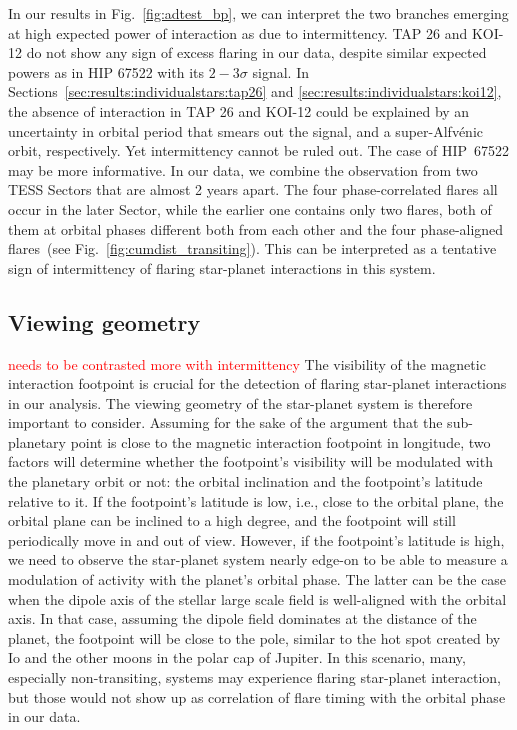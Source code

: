 \documentclass[twocolumn]{aastex631}
\begin{document}
In our results in Fig.~\ref{fig:adtest_bp}, we can interpret the two branches emerging at high expected power of interaction as due to intermittency. TAP 26 and KOI-12 do not show any sign of excess flaring in our data, despite similar expected powers as in HIP 67522 with its $2-3\sigma$ signal. In Sections~\ref{sec:results:individualstars:tap26} and \ref{sec:results:individualstars:koi12}, the absence of interaction in TAP 26 and KOI-12 could be explained by an uncertainty in orbital period that smears out the signal, and a super-Alfv\'enic orbit, respectively. Yet intermittency cannot be ruled out. The case of HIP~67522 may be more informative. In our data, we combine the observation from two TESS Sectors that are almost 2 years apart. The four phase-correlated flares all occur in the later Sector, while the earlier one contains only two flares, both of them at orbital phases different both from each other and the four phase-aligned flares~(see Fig.~\ref{fig:cumdist_transiting}). This can be interpreted as a tentative sign of intermittency of flaring star-planet interactions in this system. 

\subsection{Viewing geometry}
\label{sec:discussion:viewing}
\textcolor{red}{needs to be contrasted more with intermittency}
The visibility of the magnetic interaction footpoint is crucial for the detection of flaring star-planet interactions in our analysis. The viewing geometry of the star-planet system is therefore important to consider. Assuming for the sake of the argument that the sub-planetary point is close to the magnetic interaction footpoint in longitude, two factors will determine whether the footpoint's visibility will be modulated with the planetary orbit or not: the orbital inclination and the footpoint's latitude relative to it. If the footpoint's latitude is low, i.e., close to the orbital plane, the orbital plane can be inclined to a high degree, and the footpoint will still periodically move in and out of view. However, if the footpoint's latitude is high, we need to observe the star-planet system nearly edge-on to be able to measure a modulation of activity with the planet's orbital phase. The latter can be the case when the dipole axis of the stellar large scale field is well-aligned with the orbital axis. In that case, assuming the dipole field dominates at the distance of the planet, the footpoint will be close to the pole, similar to the hot spot created by Io and the other moons in the polar cap of Jupiter. In this scenario, many, especially non-transiting, systems may experience flaring star-planet interaction, but those would not show up as correlation of flare timing with the orbital phase in our data.
\end{document}

